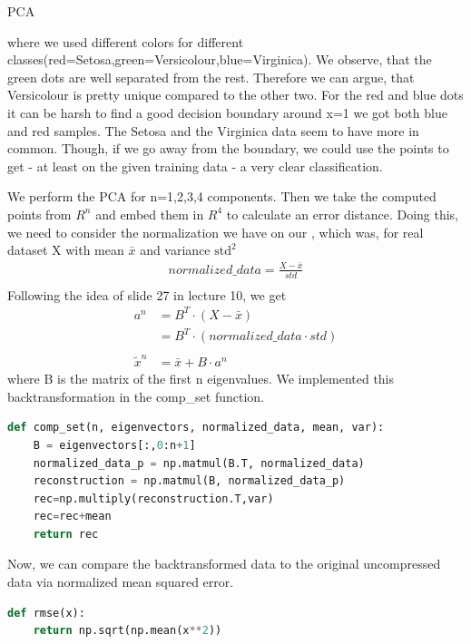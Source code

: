 \begin{task}[]{PCA}
\begin{subtask}
\begin{figure}[H]
\end{figure}
where we used different colors for different classes(red=Setosa,green=Versicolour,blue=Virginica). We observe, that the green dots are well separated from the rest. Therefore we can argue, that Versicolour is pretty unique compared to the other two. For the red and blue dots it can be harsh to find a good decision boundary around x=1 we got both blue and red samples. The Setosa and the Virginica data seem to have more in common. Though, if we go away from the boundary, we could use the points to get - at least on the given training data - a very clear classification.
\end{subtask}
\begin{subtask}
We perform the PCA for n=1,2,3,4 components. Then we take the computed points from $R^{n}$ and embed them in $R^4$ to calculate an error distance. Doing this, we need to consider the normalization we have on our , which was, for real dataset X with mean $\bar{x}$ and variance $\text{std}^2$ 
\begin{align*}
normalized\_data=\frac{X-\bar{x}}{std}\\
\end{align*}
Following the idea of slide 27 in lecture 10, we get
\begin{align*}
a^n&=B^T\cdot\left( X-\bar{x}\right) \\&= B^T\cdot\left( normalized\_data \cdot std\right) \\
\\
\tilde{x}^n&=\bar{x}+B\cdot a^n
\end{align*}
where B is the matrix of the first n eigenvalues. We implemented this backtransformation in the comp\_set function.
\begin{lstlisting}[language=python]
def comp_set(n, eigenvectors, normalized_data, mean, var):
	B = eigenvectors[:,0:n+1]
	normalized_data_p = np.matmul(B.T, normalized_data) 
	reconstruction = np.matmul(B, normalized_data_p)
	rec=np.multiply(reconstruction.T,var)
	rec=rec+mean
	return rec
\end{lstlisting}
Now, we can compare the backtransformed data to the original uncompressed data via normalized mean squared error.
\begin{lstlisting}[language=python]
def rmse(x):
	return np.sqrt(np.mean(x**2))


\end{lstlisting}
\end{subtask}
\end{task}
